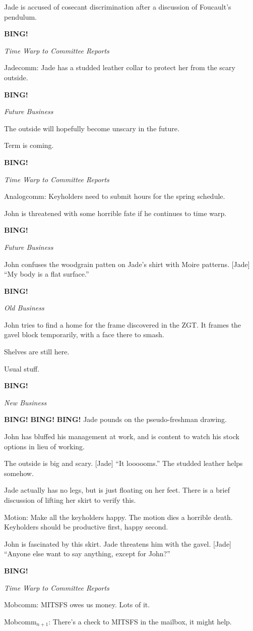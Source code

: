 \documentclass[12pt]{article}
\newcommand{\bing}{{\bf BING!} }
\newcommand{\goto}[1]{\bing \vskip 12pt \centerline{{\em{#1}}}}
\begin{document}
Jade is accused of cosecant discrimination after a discussion of
Foucault's pendulum.

\goto{Time Warp to Committee Reports}

Jadecomm: Jade has a studded leather collar to protect her from
the scary outside.

\goto{Future Business}

The outside will hopefully become unscary in the future.

Term is coming.

\goto{Time Warp to Committee Reports}

Analogcomm: Keyholders need to submit hours for the spring schedule.

John is threatened with some horrible fate if he continues to time
warp.

\goto{Future Business}

John confuses the woodgrain patten on Jade's shirt with Moire patterns.
[Jade] ``My body is a flat surface.''

\goto{Old Business}

John tries to find a home for the frame discovered in the ZGT.  It
frames the gavel block temporarily, with a face there to smash.

Shelves are still here.

Usual stuff.

\goto{New Business}

\bing \bing \bing  Jade pounds on the pseudo-freshman drawing.

John has bluffed his management at work, and is content to watch
his stock options in lieu of working.

The outside is big and scary.  [Jade] ``It loooooms.''  The studded
leather helps somehow.

Jade actually has no legs, but is just floating on her feet.  There
is a brief discussion of lifting her skirt to verify this.

Motion: Make all the keyholders happy.  The motion dies a horrible
death.  Keyholders should be productive first, happy second.

John is fascinated by this skirt.  Jade threatens him with the gavel.
[Jade] ``Anyone else want to say anything, except for John?''

\goto{Time Warp to Committee Reports}

Mobcomm: MITSFS owes us money.  Lots of it.

Mobcomm$_{n+1}$: There's a check to MITSFS in the mailbox, it might help.
\end{document}
